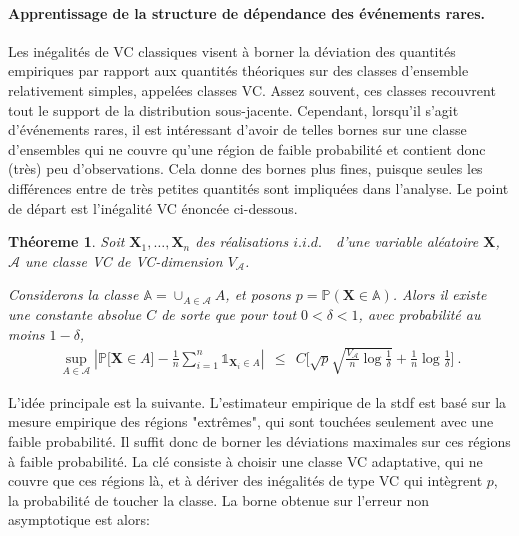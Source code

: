 \documentclass[a4paper, 12pt]{article}
\newtheorem{theoreme}{Théoreme}
\newcommand\iid{\ensuremath{\mathit{i.i.d.}}\ }
\begin{document}
\paragraph{Apprentissage de la structure de dépendance des événements rares.}
Les inégalités de VC classiques visent à borner la déviation des quantités empiriques par rapport aux quantités théoriques sur des classes d'ensemble relativement simples, appelées classes VC. Assez souvent, ces classes recouvrent tout le support de la distribution sous-jacente. Cependant, lorsqu'il s'agit d'événements rares, il est intéressant d'avoir de telles bornes sur une classe d'ensembles qui ne couvre qu'une région de faible probabilité et contient donc (très) peu d'observations. Cela donne des bornes plus fines, puisque seules les différences entre de très petites quantités sont impliquées dans l'analyse. Le point de départ est l'inégalité VC énoncée ci-dessous. %

\begin{theoreme}
\label{resume_fr:thm-princ} 
Soit $\mathbf{X}_1,\ldots,\mathbf{X}_n$ des réalisations \iid~d'une variable aléatoire $\mathbf{X}$, $\mathcal{A}$  une classe VC de VC-dimension $V_{\mathcal{A}}$. 

Considerons la classe $\mathbb{A} = \cup_{A \in \mathcal{A}} A$, et posons $p = \mathbb{P}(\mathbf{X} \in \mathbb{A})$. 
Alors il existe une constante absolue $ C $ de sorte que pour tout $ 0 <\delta <1 $, avec probabilité au moins $ 1- \delta $,
\begin{align*}
\sup_{A \in \mathcal{A}} \left| \mathbb{P} \big[\mathbf{X} \in A\big] - \frac{1}{n} \sum_{i=1}^n \mathds{1}_{\mathbf{X}_i \in A}  \right| ~~\le~~ C \bigg[ \sqrt{p}\sqrt{\frac{V_{\mathcal{A}}}{n} \log{\frac{1}{\delta}}} + \frac{1}{n} \log{\frac{1}{\delta}} \bigg]~.
\end{align*}
\end{theoreme}

L'idée principale est la suivante. L'estimateur empirique de la {\sc stdf} est basé sur la mesure empirique des régions "extrêmes", qui sont touchées seulement avec une faible probabilité. Il suffit donc de borner les déviations maximales sur ces régions à faible probabilité.
La clé consiste à choisir une classe VC adaptative, qui ne couvre que ces régions là, et à dériver des inégalités de type VC qui intègrent $p$, la probabilité de toucher la classe. La borne obtenue sur l'erreur non asymptotique est alors:
\end{document}
